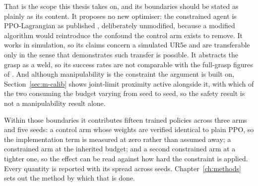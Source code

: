 That is the scope this thesis takes on, and its boundaries should be stated as plainly as its
content. It proposes no new optimiser: the constrained agent is PPO-Lagrangian as published
\cite{ray2019benchmarking}, deliberately unmodified, because a modified algorithm would
reintroduce the confound the control arm exists to remove. It works in simulation, so its claims
concern a simulated UR5e and are transferable only in the sense that
\cite{shahid2022continuous_grasping} demonstrates such transfer is possible. It abstracts the
grasp as a weld, so its success rates are not comparable with the full-grasp figures of
\cite{ferreira2025grasping}. And although manipulability is the constraint the argument is built
on, Section~\ref{sec:m-calib} shows joint-limit proximity active alongside it, with which of the
two consuming the budget varying from seed to seed, so the safety result is not a manipulability
result alone.

Within those boundaries it contributes fifteen trained policies across three arms and five
seeds: a control arm whose weights are verified identical to plain PPO, so the implementation
term is measured at zero rather than assumed away; a constrained arm at the inherited budget;
and a second constrained arm at a tighter one, so the effect can be read against how hard the
constraint is applied. Every quantity is reported with its spread across seeds.
Chapter~\ref{ch:methods} sets out the method by which that is done.
